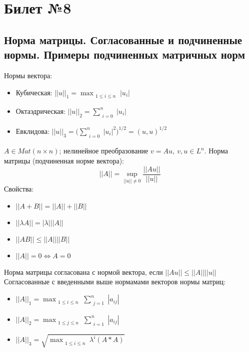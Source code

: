 \documentclass[a4paper]{article}
\begin{document}
\section{Билет №8}
\subsection{Норма матрицы. Согласованные и подчиненные нормы. Примеры подчиненных матричных норм}
Нормы вектора:
\begin{itemize}
	\item Кубическая: $ ||u||_1 = \max_{\substack{1\leq i \leq n}} |u_i| $
	\item Октаэдрическая: $ ||u||_2 = \sum_{\substack{i=0}}^n |u_i| $
	\item Евклидова: $ ||u||_3 = \bigg( \sum_{\substack{i=0}}^n |u_i|^2 \bigg)^{1/2} = (u,u)^{1/2}$
\end{itemize}
$A \in Mat(n \times n)$; нелинейное преобразование $v = Au,\ v,u \in L^n$. Норма матрицы (подчиненная норме вектора): $$ ||A|| = \sup_{||u||\neq 0} \frac{||Au||}{||u||} $$
Свойства: \begin{itemize}
	\item $ ||A+B|| = ||A|| + ||B||$
	\item $ ||\lambda A|| = |\lambda| ||A||$
	\item $ ||AB|| \leq ||A|| ||B||$
	\item $ ||A|| = 0 \iff A=0 $
\end{itemize}
Норма матрицы согласована с нормой вектора, если $ ||Au|| \leq ||A|| ||u||$ \\
Согласованные с введенными выше нормамами векторов нормы матриц:
\begin{itemize}
	\item $ ||A||_1 = \max_{\substack{1 \leq i \leq n}} \sum_{\substack{j=1}}^n |a_{ij}|$
	\item $ ||A||_2 = \max_{\substack{1 \leq j \leq n}} \sum_{\substack{i=1}}^n |a_{ij}|$
	\item $ ||A||_3 = \sqrt{\max_{\substack{1 \leq i \leq n}} \lambda^i (A*A)} $
\end{itemize}
\end{document}
